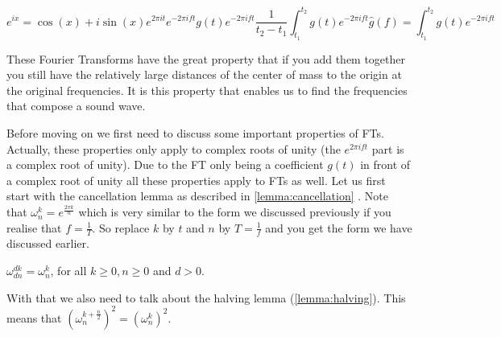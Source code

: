 \begin{subequations}
    \begin{equation}
        e^{ix} = \cos(x) + i\sin(x)
        \label{eq:euler}
    \end{equation}
    \begin{equation}
        e^{2\pi it}
        \label{eq:euler rotate}
    \end{equation}
    \begin{equation}
        e^{-2\pi ift}
        \label{eq:euler freq}
    \end{equation}
    \begin{equation}
        g(t)e^{-2\pi ift}
        \label{eq:euler wave}
    \end{equation}
    \begin{equation}
        \frac{1}{t_2 - t_1}\int^{t_2}_{t_1}g(t)e^{-2\pi ift}
        \label{eq:euler int}
    \end{equation}
    \begin{equation}
        \hat{g}(f) = \int^{t_2}_{t_1}g(t)e^{-2\pi ift}
        \label{eq:ft}
    \end{equation}
\end{subequations}

These Fourier Transforms have the great property that if you add them together you still have the relatively large distances of the center of mass to the origin at the original frequencies. It 
is this property that enables us to find the frequencies that compose a sound wave. 

Before moving on we first need to discuss some important properties of FTs. Actually, these properties only apply to complex roots of unity (the $e^{2\pi ift}$ part is a complex root of unity). 
Due to the FT only being a coefficient $g(t)$ in front of a complex root of unity all these properties apply to FTs as well. Let us first start with the cancellation lemma as described in
\autoref{lemma:cancellation} \cite{cancellation}. Note that $\omega^k_n = e^{\frac{2\pi k}{n}}$ which is very similar to the form we discussed previously if you realise that $f = \frac{1}{T}$. 
So replace $k$ by $t$ and $n$ by $T = \frac{1}{f}$ and you get the form we have discussed earlier.

\begin{lemma} \label{lemma:cancellation}
    $\omega^{dk}_{dn} = \omega^k_n$, for all $k \geq 0, n \geq 0$ and $d > 0$.
\end{lemma}

With that we also need to talk about the halving lemma (\autoref{lemma:halving}). This means that $(\omega^{k + \frac{n}{2}}_n)^2 = (\omega^k_n)^2$. 

